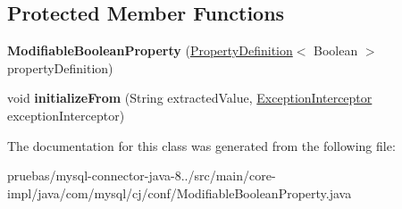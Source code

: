 \subsection*{Protected Member Functions}
\begin{DoxyCompactItemize}
\item 
\mbox{\label{classcom_1_1mysql_1_1cj_1_1conf_1_1_modifiable_boolean_property_a934c78f3cdc4dbc27413543913934cd2}} 
{\bfseries Modifiable\+Boolean\+Property} (\mbox{\hyperlink{interfacecom_1_1mysql_1_1cj_1_1conf_1_1_property_definition}{Property\+Definition}}$<$ Boolean $>$ property\+Definition)
\item 
\mbox{\label{classcom_1_1mysql_1_1cj_1_1conf_1_1_modifiable_boolean_property_a7346523d45730c72d95548c2d7cc3a6f}} 
void {\bfseries initialize\+From} (String extracted\+Value, \mbox{\hyperlink{interfacecom_1_1mysql_1_1cj_1_1exceptions_1_1_exception_interceptor}{Exception\+Interceptor}} exception\+Interceptor)
\end{DoxyCompactItemize}


The documentation for this class was generated from the following file\+:\begin{DoxyCompactItemize}
\item 
pruebas/mysql-\/connector-\/java-\/8../src/main/core-\/impl/java/com/mysql/cj/conf/Modifiable\+Boolean\+Property.\+java\end{DoxyCompactItemize}
